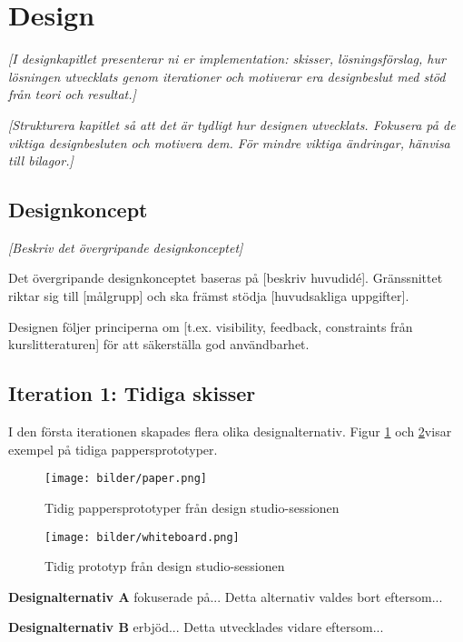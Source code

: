 \section{Design}

\textit{[I designkapitlet presenterar ni er implementation: skisser, lösningsförslag, hur lösningen utvecklats genom iterationer och motiverar era designbeslut med stöd från teori och resultat.]}

\textit{[Strukturera kapitlet så att det är tydligt hur designen utvecklats. Fokusera på de viktiga designbesluten och motivera dem. För mindre viktiga ändringar, hänvisa till bilagor.]}


\subsection{Designkoncept}

\textit{[Beskriv det övergripande designkonceptet]}

Det övergripande designkonceptet baseras på [beskriv huvudidé]. Gränssnittet riktar sig till [målgrupp] och ska främst stödja [huvudsakliga uppgifter].

Designen följer principerna om [t.ex. visibility, feedback, constraints från kurslitteraturen] för att säkerställa god användbarhet.


\subsection{Iteration 1: Tidiga skisser}

I den första iterationen skapades flera olika designalternativ. Figur \ref{fig:tidiga_skisser} och \ref{fig:tidiga_2}visar exempel på tidiga pappersprototyper.

\begin{figure}[H]
    \centering
    \texttt{[image: bilder/paper.png]}
    \caption{Tidig pappersprototyper från design studio-sessionen}
    \label{fig:tidiga_skisser}
\end{figure}

\begin{figure}[H]
    \centering
    \texttt{[image: bilder/whiteboard.png]}
    \caption{Tidig prototyp från design studio-sessionen}
    \label{fig:tidiga_2}
\end{figure}

\textbf{Designalternativ A} fokuserade på... Detta alternativ valdes bort eftersom...

\textbf{Designalternativ B} erbjöd... Detta utvecklades vidare eftersom...



